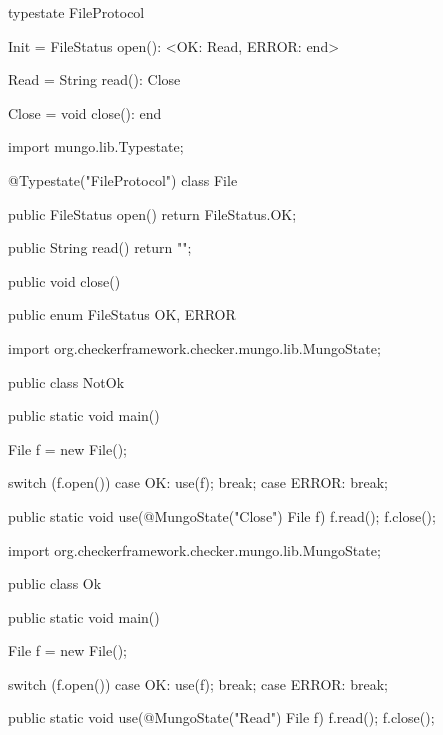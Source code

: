 \begin{code}
typestate FileProtocol {

  Init = {
    FileStatus open(): <OK: Read, ERROR: end>
  }

  Read = {
    String read(): Close
  }

  Close = {
    void close(): end
  }

}\end{code}

\begin{code}
import mungo.lib.Typestate;

@Typestate("FileProtocol")
class File {

  public FileStatus open() {
    return FileStatus.OK;
  }

  public String read() {
    return "";
  }

  public void close() {
  }

}\end{code}

\begin{code}
public enum FileStatus {
  OK, ERROR
}\end{code}

\begin{code}
import org.checkerframework.checker.mungo.lib.MungoState;

public class NotOk {

  public static void main() {
    File f = new File();

    switch (f.open()) {
      case OK:
        use(f);
        break;
      case ERROR:
        break;
    }
  }

  public static void use(@MungoState("Close") File f) {
    f.read();
    f.close();
  }

}\end{code}

\begin{code}
import org.checkerframework.checker.mungo.lib.MungoState;

public class Ok {

  public static void main() {
    File f = new File();

    switch (f.open()) {
      case OK:
        use(f);
        break;
      case ERROR:
        break;
    }
  }

  public static void use(@MungoState("Read") File f) {
    f.read();
    f.close();
  }

}\end{code}

